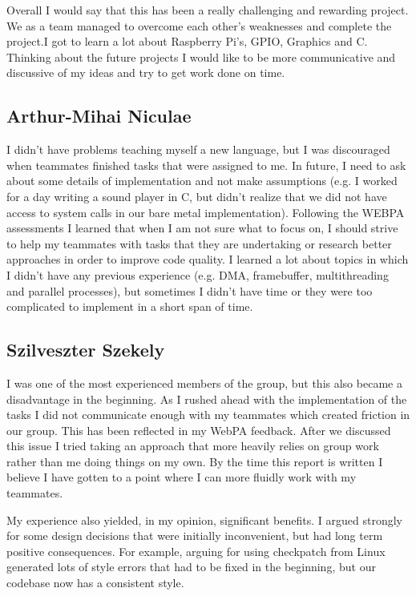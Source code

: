 \documentclass[11pt]{article}
\begin{document}
Overall I would say that this has been a really challenging and rewarding
project. We as a team managed to overcome each other's weaknesses and complete
the project.I got to learn a lot about Raspberry Pi's, GPIO, Graphics and C.
Thinking about the future projects I would like to be more communicative and
discussive of my ideas and try to get work done on time.

\subsection{Arthur-Mihai Niculae}

I didn’t have problems teaching myself a new language, but I was discouraged
when teammates finished tasks that were assigned to me. In future, I need to
ask about some details of implementation and not make assumptions (e.g.
I worked for a day writing a sound player in C, but didn’t realize that we did
not have access to system calls in our bare metal implementation). Following
the WEBPA assessments I learned that when I am not sure what to focus on,
I should strive to help my teammates with tasks that they are undertaking or
research better approaches in order to improve code quality. I learned a lot
about topics in which I didn’t have any previous experience (e.g. DMA,
framebuffer, multithreading and parallel processes), but sometimes I didn’t
have time or they were too complicated to implement in a short span of time.

\subsection{Szilveszter Szekely}

I was one of the most experienced members of the group, but this also became
a disadvantage in the beginning. As I rushed ahead with the implementation of
the tasks I did not communicate enough with my teammates which created friction
in our group. This has been reflected in my WebPA feedback. After we discussed
this issue I tried taking an approach that more heavily relies on group work
rather than me doing things on my own. By the time this report is written
I believe I have gotten to a point where I can more fluidly work with my
teammates.

My experience also yielded, in my opinion, significant benefits. I argued
strongly for some design decisions that were initially inconvenient, but had
long term positive consequences. For example, arguing for using checkpatch from
Linux generated lots of style errors that had to be fixed in the beginning, but
our codebase now has a consistent style.
\end{document}

